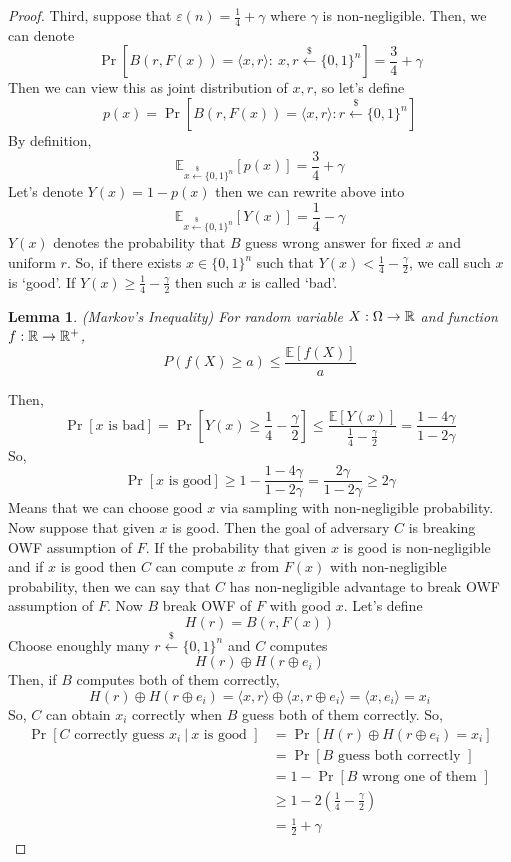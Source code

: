 \documentclass[12pt, a4paper, openany, twoside]{book}
\newtheorem{lem}[thm]{Lemma}
\theoremstyle{definition}
\theoremstyle{remark}
\newcommand{\BE}{{\mathbb {E}}} \newcommand{\BF}{{\mathbb {F}}}
\theoremstyle{plain}
\numberwithin{equation}{section}
\begin{document}
\begin{proof}
Third, suppose that $\varepsilon(n) = \frac{1}{4} + \gamma$ where $\gamma$ is non-negligible. 
Then, we can denote 
\[\Pr[B(r, F(x)) = \langle x, r \rangle :~ x, r \xleftarrow{\$} \{0,1\}^n] = \frac{3}{4} + \gamma\]
Then we can view this as joint distribution of $x, r$, so let's define 
\[p(x) = \Pr[B(r, F(x)) = \langle x, r \rangle : r \xleftarrow{\$} \{0,1\}^n ]\]
By definition, 
\[\BE_{x \xleftarrow{\$} \{0,1\}^n}[p(x)] = \frac{3}{4} + \gamma\]
Let's denote $Y(x) = 1 - p(x)$ then we can rewrite above into 
\[\BE_{x \xleftarrow{\$} \{0,1\}^n}[Y(x)] = \frac{1}{4} - \gamma\]
$Y(x)$ denotes the probability that $B$ guess wrong answer for fixed $x$ and uniform $r$. So, 
if there exists $x \in \{0,1\}^n$ such that $Y(x) < \frac{1}{4} - \frac{\gamma}{2}$, we call such $x$ is \lq good'. If $Y(x) \geq \frac{1}{4} - \frac{\gamma}{2}$ 
then such $x$ is called \lq bad'. 

\begin{lem}(Markov's Inequality)
    For random variable $X: \Omega \rightarrow {\mathbb {R}}$ and function $f: {\mathbb {R}} \rightarrow {\mathbb {R}}^+$, 
    \[P(f(X) \geq a) \leq \frac{\BE[f(X)]}{a}\]
\end{lem}

Then, 
\[\Pr[x \text{ is bad}] = \Pr[Y(x) \geq \frac{1}{4} - \frac{\gamma}{2}] \leq \frac{\BE[Y(x)]}{\frac{1}{4}-\frac{\gamma}{2}} = \frac{1 - 4\gamma}{1 - 2\gamma}\]
So, 
\[\Pr[x \text{ is good}] \geq 1 - \frac{1-4\gamma}{1-2\gamma} = \frac{2\gamma}{1 - 2\gamma}\geq 2\gamma\]
Means that we can choose good $x$ via sampling with non-negligible probability. Now suppose that given $x$ is good. 
Then the goal of adversary $C$ is breaking OWF assumption of $F$. If the probability that given $x$ is good is non-negligible and 
if $x$ is good then $C$ can compute $x$ from $F(x)$ with non-negligible probability, then we can say that $C$ has non-negligible advantage to break OWF assumption of $F$. 
Now $B$ break OWF of $F$ with good $x$. Let's define 
\[H(r) = B(r, F(x))\] 
Choose enoughly many $r \xleftarrow{\$} \{0,1\}^n$ and $C$ computes 
\[H(r) \oplus H(r \oplus e_i)\]
Then, if $B$ computes both of them correctly, 
\[H(r) \oplus H(r \oplus e_i) = \langle x, r \rangle \oplus \langle x, r \oplus e_i \rangle = \langle x, e_i \rangle = x_i\]
So, $C$ can obtain $x_i$ correctly when $B$ guess both of them correctly. So, 
\begin{align*} 
    \Pr[C \text{ correctly guess } x_i ~|~ x \text{ is good }] &= \Pr[H(r) \oplus H(r \oplus e_i) = x_i] \\
    & = \Pr[B \text{ guess both correctly }] \\ 
    & = 1 - \Pr[B \text{ wrong one of them }] \\
    & \geq 1 - 2\left(\frac{1}{4} - \frac{\gamma}{2}\right) \\
    & = \frac{1}{2} + \gamma
\end{align*}


\end{proof}
\end{document}
